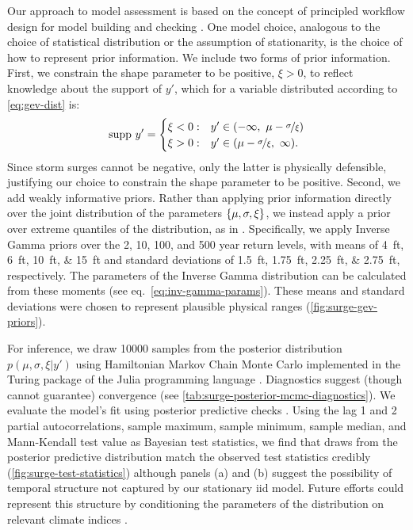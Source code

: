 \documentclass[11pt]{article}
\begin{document}
Our approach to model assessment is based on the concept of principled workflow design for model building and checking \citep[see][for details]{gelman_workflow:2020}.
One model choice, analogous to the choice of statistical distribution or the assumption of stationarity, is the choice of how to represent prior information.
We include two forms of prior information.
First, we constrain the shape parameter to be positive, $\xi > 0$, to reflect knowledge about the support of $y'$, which for a variable distributed according to \cref{eq:gev-dist} is:
\begin{equation*}
    \mathrm{supp}~ y' =
    \begin{cases}
        \xi < 0: & y' \in \qty(-\infty,~ \mu - \nicefrac{\sigma}{\xi}) \\
        \xi > 0: & y' \in \qty(\mu-\nicefrac{\sigma}{\xi},~ \infty).
    \end{cases}
\end{equation*}
Since storm surges cannot be negative, only the latter is physically defensible, justifying our choice to constrain the shape parameter to be positive.
Second, we add weakly informative priors.
Rather than applying prior information directly over the joint distribution of the parameters $\qty{\mu,\sigma,\xi}$, we instead apply a prior over extreme quantiles of the distribution, as in \citet{coles_evd:1996}.
Specifically, we apply Inverse Gamma priors over the 2, 10, 100, and 500 year return levels, with means of \SIlist{4;6;10;15}{ft} and standard deviations of \SIlist{1.5;1.75;2.25;2.75}{ft}, respectively.
The parameters of the Inverse Gamma distribution can be calculated from these moments (see eq.~\ref{eq:inv-gamma-params}).
These means and standard deviations were chosen to represent plausible physical ranges (\cref{fig:surge-gev-priors}).

For inference, we draw \num{10000} samples from the posterior distribution $p(\mu,\sigma,\xi | y')$ using Hamiltonian Markov Chain Monte Carlo \citep{Betancourt:2017vd,hoffman_nuts:2011} implemented in the Turing package of the Julia programming language \citep{perkel_julia:2019,ge_turing:2018,tarek_dynamicppl:2020,besancon_distributions.jl:2021,bezanson_julia:2012}.
Diagnostics suggest (though cannot guarantee) convergence (see \cref{tab:surge-posterior-mcmc-diagnostics}).
We evaluate the model's fit using posterior predictive checks \citep[see][section 2.4 and references therein]{gelman_workflow:2020}.
Using the lag 1 and 2 partial autocorrelations, sample maximum, sample minimum, sample median, and Mann-Kendall test value as Bayesian test statistics, we find that draws from the posterior predictive distribution match the observed test statistics credibly (\cref{fig:surge-test-statistics}) although panels (a) and (b) suggest the possibility of temporal structure not captured by our stationary \gls{iid} model.
Future efforts could represent this structure by conditioning the parameters of the distribution on relevant climate indices \citep[as in][]{wong_structural:2020,farnham_orbrep:2018,farnham_jetstream:2017,ossandon_semibayesian:2021}.
\end{document}
